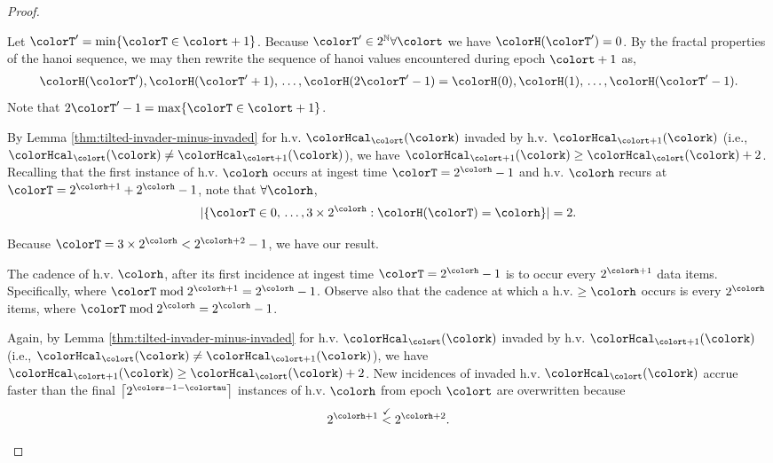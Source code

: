 \begin{proof}
\begin{proofpart}
Let $\colorT' = \min\{\colorT \in \colort + 1\}$.
Because $\colorT' \in 2^{\mathbb{N}} \forall \colort$ we have $\colorH(\colorT') = 0$.
By the fractal properties of the hanoi sequence, we may then rewrite the sequence of hanoi values encountered during epoch $\colort + 1$ as,
\begin{align*}
\colorH(\colorT'), \colorH(\colorT'+1), \,\ldots, \colorH(2\colorT' - 1) = \colorH(0), \colorH(1), \,\ldots, \colorH(\colorT' - 1).
\end{align*}
Note that $2\colorT' - 1 = \max\{\colorT \in \colort + 1\}$.

By Lemma \ref{thm:tilted-invader-minus-invaded} for h.v. $\colorHcal_{\colort}(\colork)$ invaded by h.v. $\colorHcal_{\colort + 1}(\colork)$ (i.e., $\colorHcal_{\colort}(\colork) \neq \colorHcal_{\colort + 1}(\colork)$), we have $\colorHcal_{\colort + 1}(\colork) \geq \colorHcal_{\colort}(\colork) + 2$.
Recalling that the first instance of h.v. $\colorh$ occurs at ingest time $\colorT = 2^{\colorh} - 1$ and h.v. $\colorh$ recurs at $\colorT = 2^{\colorh + 1} + 2^{\colorh} - 1$, note that $\forall\colorh$,
\begin{align*}
|\{\colorT \in 0,\,\ldots, 3 \times 2^{\colorh} : \colorH(\colorT) = \colorh\}| = 2.
\end{align*}
\end{proofpart}
Because $\colorT = 3 \times 2^{\colorh} < 2^{\colorh + 2} - 1$, we have our result.

\begin{proofpart}
The cadence of h.v. $\colorh$, after its first incidence at ingest time $\colorT=2^{\colorh} - 1$ is to occur every $2^{\colorh + 1}$ data items.
Specifically, where $\colorT \bmod 2^{\colorh + 1} = 2^{\colorh} - 1$.
Observe also that the cadence at which a h.v. $\geq\colorh$ occurs is every $2^{\colorh}$ items, where $\colorT \bmod 2^{\colorh} = 2^{\colorh} - 1$.

Again, by Lemma \ref{thm:tilted-invader-minus-invaded} for h.v. $\colorHcal_{\colort}(\colork)$ invaded by h.v. $\colorHcal_{\colort + 1}(\colork)$ (i.e., $\colorHcal_{\colort}(\colork) \neq \colorHcal_{\colort + 1}(\colork)$), we have $\colorHcal_{\colort + 1}(\colork) \geq \colorHcal_{\colort}(\colork) + 2$.
New incidences of invaded h.v. $\colorHcal_{\colort}(\colork)$ accrue faster than the final $\left\lceil 2^{\colors - 1 - \colortau} \right\rceil$ instances of h.v. $\colorh$ from epoch $\colort$ are overwritten because
\begin{align*}
2^{\colorh + 1} \stackrel{\checkmark}{<} 2^{\colorh + 2}.
\end{align*}
\end{proofpart}

\end{proof}
